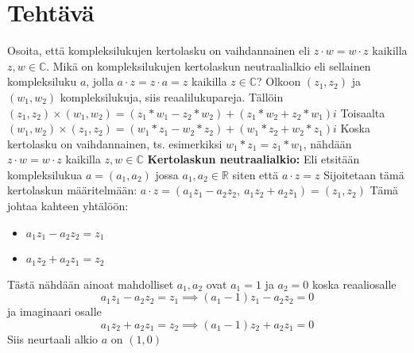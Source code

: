 \documentclass{article}
\newcounter{tehtava}
\begin{document}
\newpage
{}
\section*{Tehtävä \thetehtava}
Osoita, että kompleksilukujen kertolasku on vaihdannainen eli $z \cdot w = w \cdot z$ kaikilla $z, w \in \mathbb{C}$. Mikä on kompleksilukujen kertolaskun neutraalialkio eli sellainen kompleksiluku $a$, jolla $a \cdot z = z \cdot a = z$ kaikilla $z \in \mathbb{C}$?\newline
\linebreak
Olkoon $(z_1, z_2)$ ja $(w_1, w_2)$ kompleksilukuja, siis reaalilukupareja.\newline
Tällöin $(z_1, z_2) \times (w_1, w_2) = (z_1 * w_1 - z_2 * w_2) + (z_1 * w_2 + z_2 * w_1)i$\newline
\linebreak
Toisaalta $(w_1, w_2) \times (z_1, z_2) = (w_1 * z_1 - w_2 * z_2) + (w_1 * z_2 + w_2 * z_1)i$\newline
\linebreak
Koska kertolasku on vaihdannainen, ts. esimerkiksi $w_1 * z_1 = z_1 * w_1$, nähdään $z \cdot w = w \cdot z$ kaikilla $z, w \in \mathbb{C}$\newline
\linebreak
\textbf{Kertolaskun neutraalialkio:}\newline
Eli etsitään kompleksilukua $a = (a_1, a_2)$ jossa $a_1, a_2 \in \mathbb{R}$ siten että $a \cdot z = z$\newline
Sijoitetaan tämä kertolaskun määritelmään:\newline
$a \cdot z = \left( a_1 z_1 - a_2 z_2, \ a_1 z_2 + a_2 z_1 \right) = (z_1, z_2)$\newline
\linebreak
Tämä johtaa kahteen yhtälöön:
\begin{itemize}
    \item $a_1 z_1 - a_2 z_2 = z_1$
    \item $a_1 z_2 + a_2 z_1 = z_2$
\end{itemize}
Tästä nähdään ainoat mahdolliset $a_1, a_2$ ovat $a_1 = 1$ ja $a_2 = 0$ koska reaaliosalle
\[
a_1 z_1 - a_2 z_2 = z_1 \implies (a_1 - 1) z_1 - a_2 z_2 = 0
\]
ja imaginaari osalle
\[
a_1 z_2 + a_2 z_1 = z_2 \implies (a_1 - 1) z_2 + a_2 z_1 = 0
\]
Siis neurtaali alkio $a$ on $(1, 0)$
\end{document}
